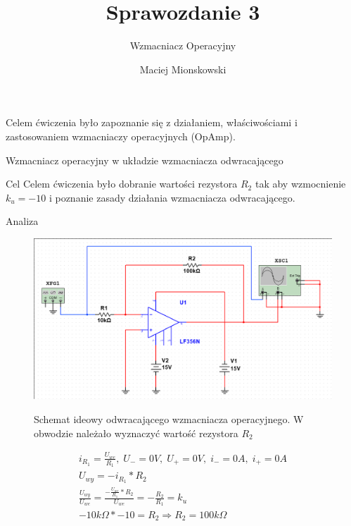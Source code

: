 \documentclass[a4paper]{scrartcl}
\author{Maciej Mionskowski}
\title{Sprawozdanie 3}
\date{}
\subtitle{Wzmacniacz Operacyjny}
\begin{document}
	{\let\newpage\relax\maketitle}
	{\begin{center}Celem ćwiczenia było zapoznanie się z działaniem, właściwościami i zastosowaniem wzmacniaczy operacyjnych (OpAmp).\end{center}}
	\begin{section}{Wzmacniacz operacyjny w układzie wzmacniacza odwracającego}
		\begin{subsection}{Cel}
			Celem ćwiczenia było dobranie wartości rezystora $R_{2}$ tak aby wzmocnienie $k_{u} = -10 $ i poznanie zasady działania wzmacniacza odwracającego.
		\end{subsection}
		\begin{subsection}{Analiza}
				\begin{figure}[ht]
				\begin{center}
					\label{fig:circuit-1}
					\includegraphics[width=0.8\linewidth]{03-circuit}
					\caption{Schemat ideowy odwracającego wzmacniacza operacyjnego. W obwodzie należało wyznaczyć wartość rezystora $ R_{2} $ }
				\end{center}
				\end{figure}

				\begin{equation*}
					\begin{aligned}
						i_{R_{1}} = \frac{U_{we}}{R_{1}},\; U_{-} = 0V,\; U_{+} = 0V,\; i_{-} = 0A,\; i_{+} = 0A  \\[5pt]
						U_{wy} = -i_{R_{1}}*R_{2}  \\[5pt]
						\frac{U_{wy}}{U_{we}} = \frac{-\frac{U_{we}}{R_{1}}*R_{2}}{U_{we}} = -\frac{R_{2}}{R_{1}} = k_{u} \\[5pt]
						-10k\Omega * -10 = R_{2} \Rightarrow R_{2} = 100k\Omega
					\end{aligned}
				\end{equation*}


\end{subsection}
\end{section}
\end{document}
